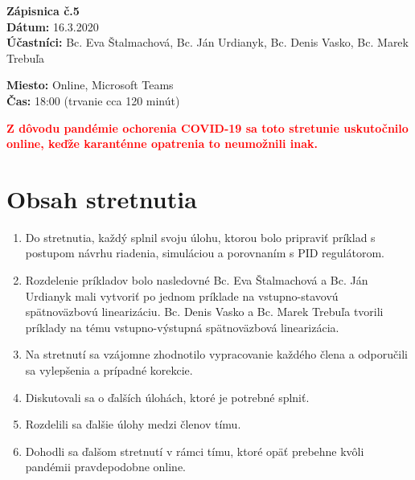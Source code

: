 
\usepackage{parskip}%
\usepackage[dvipsnames]{xcolor}

	\textbf{{\Huge Zápisnica č.5}}\\
			
	\textbf{Dátum:} 16.3.2020\\	
		
	\textbf{Účastníci:} Bc. Eva Štalmachová, Bc. Ján Urdianyk, Bc. Denis Vasko, Bc. Marek Trebuľa

	\textbf{Miesto:} Online, Microsoft Teams\\	
	
	\textbf{Čas:} 18:00 (trvanie cca 120 minút)
	
	\textbf{\textcolor{red}{Z dôvodu pandémie ochorenia COVID-19 sa toto stretunie uskutočnilo online, keďže karanténne opatrenia to neumožnili inak.}}   
    \section*{Obsah stretnutia}
    \begin{enumerate}
    	\item Do stretnutia, každý splnil svoju úlohu, ktorou bolo pripraviť príklad s postupom návrhu riadenia, simuláciou a porovnaním s PID regulátorom.
    	\item Rozdelenie príkladov bolo nasledovné Bc. Eva Štalmachová a Bc. Ján Urdianyk mali vytvoriť po jednom príklade na vstupno-stavovú spätnoväzbovú linearizáciu. Bc. Denis Vasko a Bc. Marek Trebuľa tvorili príklady na tému vstupno-výstupná spätnoväzbová linearizácia.
    	\item Na stretnutí sa vzájomne zhodnotilo vypracovanie každého člena a odporučili sa vylepšenia a prípadné korekcie.
    	\item Diskutovali sa o ďalších úlohách, ktoré je potrebné splniť.
    	\item Rozdelili sa ďalšie úlohy medzi členov tímu.
    	\item Dohodli sa ďalšom stretnutí v rámci tímu, ktoré opäť prebehne kvôli pandémii pravdepodobne online.
    \end{enumerate}    
